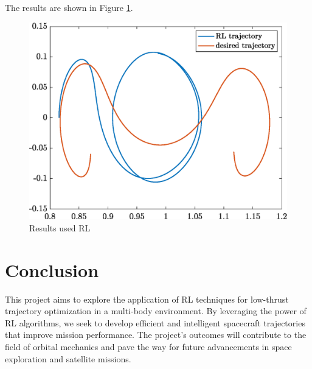 \documentclass{article}
\begin{document}
The results are shown in Figure \ref{fig:results}.
\begin{figure}[H]
	\centering
	\includegraphics[width=\textwidth]{trajectory_RL}
	\caption{Results used RL}
	\label{fig:results}
\end{figure}



\section{Conclusion}
This project aims to explore the application of RL techniques for low-thrust trajectory optimization in a multi-body environment. By leveraging the power of RL algorithms, we seek to develop efficient and intelligent spacecraft trajectories that improve mission performance. The project's outcomes will contribute to the field of orbital mechanics and pave the way for future advancements in space exploration and satellite missions.
\end{document}
